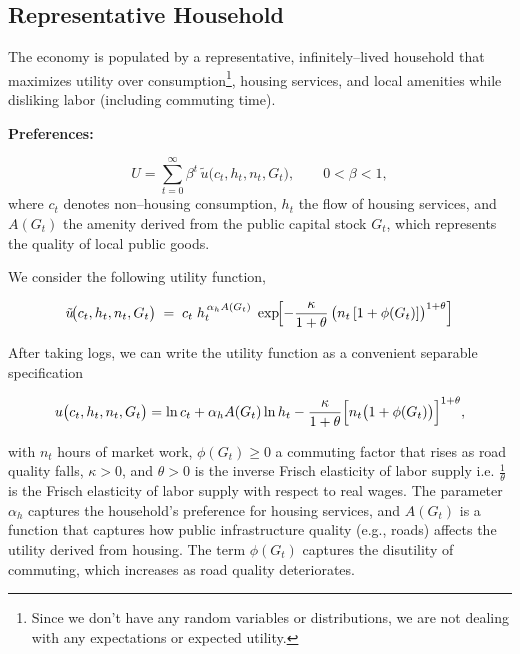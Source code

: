 \subsection{Representative Household}
The economy is populated by a representative, infinitely–lived household that maximizes utility over consumption\footnote{Since we don't have any random variables or distributions, we are not dealing with any expectations or expected utility.}, housing services, and local amenities while disliking labor (including commuting time).


{\bf Preferences:}

\begin{equation}
U = \sum_{t=0}^{\infty} \beta^{t}\, \tilde u\!\bigl(c_t,h_t,n_t,G_t\bigr),\qquad 0<\beta<1,
\end{equation}
where $c_t$ denotes non–housing consumption, $h_t$ the flow of housing services, and $A(G_t)$ the amenity derived from the public capital stock $G_t$, which represents the quality of local public goods.

We consider the following utility function,

\begin{equation}
\tilde u\!\bigl(c_t,h_t,n_t,G_t\bigr)
\;=\;
c_t\;
h_t^{\,\alpha_h A(G_t)}
\;\exp\!\Bigl[
-\frac{\kappa}{1+\theta}\,
\bigl(n_t\,[1+\phi(G_t)]\bigr)^{1+\theta}
\Bigr]
\end{equation}

After taking logs, we can write the utility function as a convenient separable specification


\begin{equation}
 u\bigl(c_t,h_t, n_t, G_t\bigr)= \ln c_t + \alpha_h A(G_t) \ln h_t - \frac{\kappa}{1+\theta}\Bigl[n_t\bigl(1+\phi(G_t)\bigr)\Bigr]^{1+\theta},\label{eq:utility}
\end{equation}


with $n_t$ hours of market work, $\phi(G_t)\ge0$ a commuting factor that rises as road quality falls, $\kappa>0$, and $\theta>0$ is the inverse Frisch elasticity of labor supply i.e. $\frac{1}{\theta}$ is the Frisch elasticity of labor supply with respect to real wages. The parameter $\alpha_h$ captures the household’s preference for housing services, and $A(G_t)$ is a function that captures how public infrastructure quality (e.g., roads) affects the utility derived from housing. The term $\phi(G_t)$ captures the disutility of commuting, which increases as road quality deteriorates.

